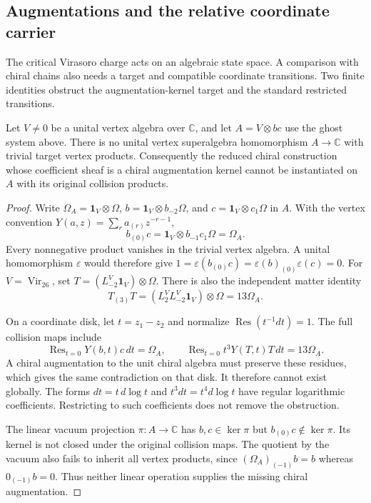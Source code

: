 \subsection{Augmentations and the relative coordinate carrier}

The critical Virasoro charge acts on an algebraic state space.
A comparison with chiral chains also needs a target and compatible coordinate transitions.
Two finite identities obstruct the augmentation-kernel target and the standard restricted transitions.

\begin{proposition}\label{prop:vir-no-augmentation}
Let $V\neq0$ be a unital vertex algebra over $\mathbb C$, and let $A=V\otimes bc$ use the ghost system above.
There is no unital vertex superalgebra homomorphism $A\to\mathbb C$ with trivial target vertex products.
Consequently the reduced chiral construction whose coefficient sheaf is a chiral augmentation kernel cannot be instantiated on $A$ with its original collision products.
\end{proposition}

\begin{proof}
Write $\Omega_A=\mathbf1_V\otimes\Omega$, $b=\mathbf1_V\otimes b_{-2}\Omega$, and $c=\mathbf1_V\otimes c_1\Omega$ in $A$.
With the vertex convention $Y(a,z)=\sum_r a_{(r)}z^{-r-1}$,
\[
 b_{(0)}c=\mathbf1_V\otimes b_{-1}c_1\Omega=\Omega_A.
\]
Every nonnegative product vanishes in the trivial vertex algebra.
A unital homomorphism $\varepsilon$ would therefore give
$1=\varepsilon(b_{(0)}c)=\varepsilon(b)_{(0)}\varepsilon(c)=0$.
For $V=\operatorname{Vir}_{26}$, set $T=(L_{-2}^V\mathbf1_V)\otimes\Omega$.
There is also the independent matter identity
\[
 T_{(3)}T=(L_2^VL_{-2}^V\mathbf1_V)\otimes\Omega=13\Omega_A.
\]

On a coordinate disk, let $t=z_1-z_2$ and normalize
$\operatorname{Res}(t^{-1}dt)=1$.
The full collision maps include
\[
 \operatorname{Res}_{t=0}Y(b,t)c\,dt=\Omega_A,
 \qquad
 \operatorname{Res}_{t=0}t^3Y(T,t)T\,dt=13\Omega_A.
\]
A chiral augmentation to the unit chiral algebra must preserve these residues, which gives the same contradiction on that disk.
It therefore cannot exist globally.
The forms $dt=t\,d\log t$ and $t^3dt=t^4d\log t$ have regular logarithmic coefficients.
Restricting to such coefficients does not remove the obstruction.

The linear vacuum projection $\pi:A\to\mathbb C$ has $b,c\in\ker\pi$ but $b_{(0)}c\notin\ker\pi$.
Its kernel is not closed under the original collision maps.
The quotient by the vacuum also fails to inherit all vertex products, since
$(\Omega_A)_{(-1)}b=b$ whereas $0_{(-1)}b=0$.
Thus neither linear operation supplies the missing chiral augmentation.
\end{proof}

